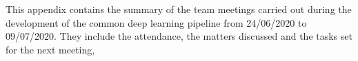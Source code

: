 This appendix contains the summary of the team meetings carried out during the development of the common deep learning pipeline from 24/06/2020 to 09/07/2020. They include the attendance, the matters discussed and the tasks set for the next meeting, 

\clearpage

